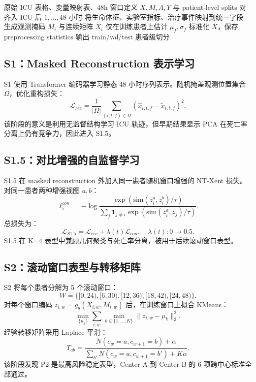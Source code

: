 \documentclass[11pt,a4paper]{article}
\begin{document}
\begin{algorithm}[H]
\caption{S0 统一 ICU 张量构建}
\label{alg:s0}
\begin{algorithmic}[1]
\Require 原始 ICU 表格、变量映射表、48h 窗口定义
\Ensure $X,M,A,Y$ 与 patient-level splits
  \State 对齐入 ICU 后 $1,\ldots,48$ 小时
  \State 将生命体征、实验室指标、治疗事件映射到统一字段
  \State 生成观测掩码 $M_i$ 与连续矩阵 $X_i$
\EndFor
\State 仅在训练患者上估计 $\mu_f,\sigma_f$
\State 标准化 $X$，保存 preprocessing statistics
\State 输出 train/val/test 患者级切分
\end{algorithmic}
\end{algorithm}

\subsection{S1：Masked Reconstruction 表示学习}
S1 使用 Transformer 编码器学习静态 48 小时序列表示。随机掩盖观测位置集合 $\Omega$，优化重构损失：
\begin{equation}
  \mathcal{L}_{rec}
  =
  \frac{1}{|\Omega|}
  \sum_{(i,t,f)\in\Omega}
  \left(\hat{x}_{i,t,f}-\tilde{x}_{i,t,f}\right)^2.
\end{equation}
该阶段的意义是利用无监督结构学习 ICU 轨迹，但早期结果显示 PCA 在死亡率分离上仍有竞争力，因此进入 S1.5。

\subsection{S1.5：对比增强的自监督学习}
S1.5 在 masked reconstruction 外加入同一患者随机窗口增强的 NT-Xent 损失。对同一患者两种增强视图 $a,b$：
\begin{equation}
  \ell_{i}^{con}
  =
  -\log
  \frac{\exp(\mathrm{sim}(z_i^a,z_i^b)/\tau)}
  {\sum_{j}\mathbf{1}_{j\neq i}\exp(\mathrm{sim}(z_i^a,z_j)/\tau)}.
\end{equation}
总损失为：
\begin{equation}
  \mathcal{L}_{S1.5}=\mathcal{L}_{rec}+\lambda(t)\mathcal{L}_{con},
  \quad \lambda(t):0\rightarrow 0.5.
\end{equation}
S1.5 在 K=4 表型中兼顾几何聚类与死亡率分离，被用于后续滚动窗口表型。

\subsection{S2：滚动窗口表型与转移矩阵}
S2 将每个患者分解为 5 个滚动窗口：
\begin{equation}
  W=\{[0,24),[6,30),[12,36),[18,42),[24,48)\}.
\end{equation}
对每个窗口编码 $z_{i,w}=g_\theta(X_{i,w},M_{i,w})$ 后，在训练窗口上拟合 KMeans：
\begin{equation}
  \min_{\{\mu_k\}}\sum_{i,w}\min_{k\in\{1,\ldots,K\}}\|z_{i,w}-\mu_k\|_2^2.
\end{equation}
经验转移矩阵采用 Laplace 平滑：
\begin{equation}
  T_{ab}=
  \frac{N(c_w=a,c_{w+1}=b)+\alpha}
  {\sum_{b'}N(c_w=a,c_{w+1}=b')+K\alpha}.
\end{equation}
该阶段发现 P2 是最高风险稳定表型，Center A 到 Center B 的 6 项跨中心标准全部通过。
\end{document}
